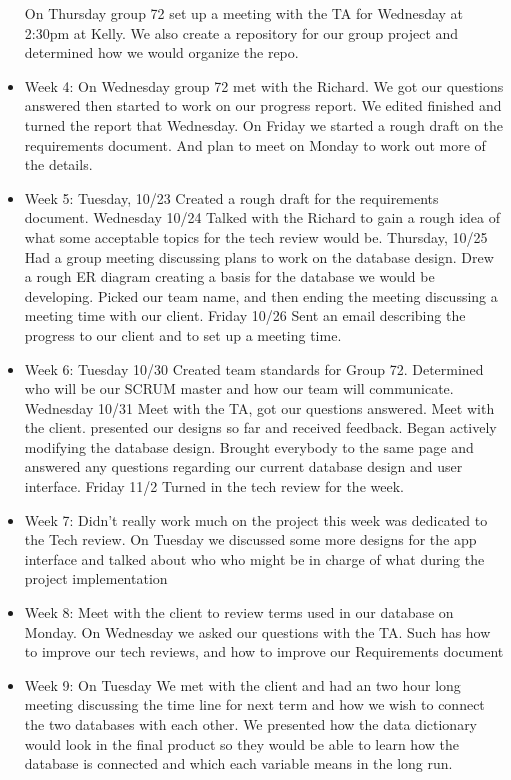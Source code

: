 \documentclass[onecolumn, draftclsnofoot,10pt, compsoc]{IEEEtran}
\begin{document}
\begin{itemize}
    On Thursday group 72 set up a meeting with the TA for Wednesday at 2:30pm at Kelly. We also create a repository for our group project and determined how we would organize the repo.
     \item Week 4: On Wednesday group 72 met with the Richard. We got our questions answered then started to work on our progress report. We edited finished and turned the report that Wednesday. On Friday we started a rough draft on the requirements document. And plan to meet on Monday to work out more of the details.
     \item Week 5: Tuesday, 10/23 Created a rough draft for the requirements document. Wednesday 10/24 Talked with the Richard to gain a rough idea of what some acceptable topics for the tech review would be. Thursday, 10/25 Had a group meeting discussing plans to work on the database design. Drew a rough ER diagram creating a basis for the database we would be developing. Picked our team name, and then ending the meeting discussing a meeting time with our client. Friday 10/26 Sent an email describing the progress to our client and to set up a meeting time. 
     \item Week 6: Tuesday 10/30 Created team standards for Group 72. Determined who will be our SCRUM master and how our team will communicate. Wednesday 10/31 Meet with the TA, got our questions answered. Meet with the client. presented our designs so far and received feedback. Began actively modifying the database design. Brought everybody to the same page and answered any questions regarding our current database design and user interface. Friday 11/2 Turned in the tech review for the week. 
     \item Week 7: Didn't really work much on the project this week was dedicated to the Tech review. On Tuesday we discussed some more designs for the app interface and talked about who who might be in charge of what during the project implementation
     \item Week 8: Meet with the client to review terms used in our database on Monday. On Wednesday we asked our questions with the TA. Such has how to improve our tech reviews, and how to improve our Requirements document
     \item Week 9: On Tuesday We met with the client and had an two hour long meeting discussing the time line for next term and how we wish to connect the two databases with each other. We presented how the data dictionary would look in the final product so they would be able to learn how the database is connected and which each variable means in the long run.
 \end{itemize}
\end{document}
